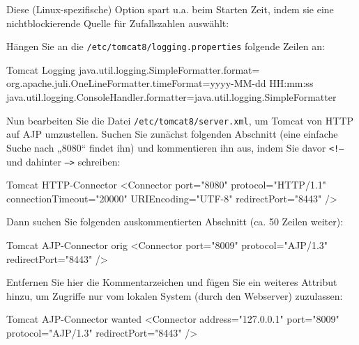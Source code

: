 \documentclass{tarentanleitung}
\begin{document}
\begin{minipage}{\linewidth}
Diese (Linux-spezifische) Option spart u.a. beim Starten Zeit,
indem sie eine nichtblockierende Quelle für Zufallszahlen auswählt:

\end{minipage}

\begin{minipage}{\linewidth}
Hängen Sie an die \texttt{/etc/tomcat8/logging.properties} folgende
Zeilen an:

\begin{lstdump}[breaklines=false]{Tomcat Logging}
java.util.logging.SimpleFormatter.format=%
org.apache.juli.OneLineFormatter.timeFormat=yyyy-MM-dd HH:mm:ss
java.util.logging.ConsoleHandler.formatter=java.util.logging.SimpleFormatter
\end{lstdump}
\end{minipage}

\begin{minipage}{\linewidth}
Nun bearbeiten Sie die Datei \texttt{/etc/tomcat8/server.xml}, um Tomcat
von HTTP auf AJP umzustellen. Suchen Sie zunächst folgenden Abschnitt
(eine einfache Suche nach „8080“ findet ihn) und kommentieren ihn aus,
indem Sie davor \texttt{<!--} und dahinter \texttt{-->} schreiben:

\begin{lstdump}[language=XML]{Tomcat HTTP-Connector}
<Connector port="8080" protocol="HTTP/1.1"
           connectionTimeout="20000"
           URIEncoding="UTF-8"
           redirectPort="8443" />
\end{lstdump}
\end{minipage}

\begin{minipage}{\linewidth}
Dann suchen Sie folgenden auskommentierten Abschnitt (ca. 50 Zeilen weiter):

\begin{lstdump}[language=XML]{Tomcat AJP-Connector orig}
<Connector port="8009" protocol="AJP/1.3" redirectPort="8443" />
\end{lstdump}

Entfernen Sie hier die Kommentarzeichen und fügen Sie ein weiteres Attribut
hinzu, um Zugriffe nur vom lokalen System (durch den Webserver) zuzulassen:

\begin{lstdump}[language=XML]{Tomcat AJP-Connector wanted}
<Connector address="127.0.0.1" port="8009" protocol="AJP/1.3" redirectPort="8443" />
\end{lstdump}
\end{minipage}
\end{document}
